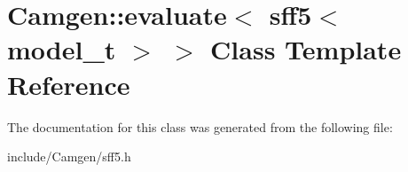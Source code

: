 \hypertarget{a00188}{\section{Camgen\-:\-:evaluate$<$ sff5$<$ model\-\_\-t $>$ $>$ Class Template Reference}
\label{a00188}
}


The documentation for this class was generated from the following file\-:\begin{DoxyCompactItemize}
\item 
include/\-Camgen/sff5.\-h\end{DoxyCompactItemize}
